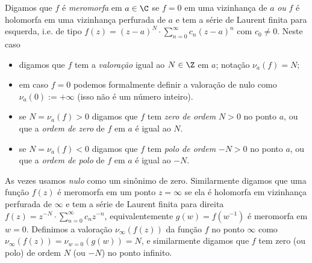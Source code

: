 \begin{defin}
Digamos que $f$ é \emph{meromorfa} em $a\in\C$ se $f=0$ em uma vizinhança de $a$
\emph{ou} $f$ é holomorfa em uma vizinhança perfurada de $a$ e tem a série de Laurent
finita para esquerda, i.e. de tipo
$f(z) = (z-a)^N \cdot \sum_{n=0}^\infty c_n (z-a)^n$
com $c_0\neq 0$.
Neste caso
\begin{itemize}
\item digamos que $f$ tem a \emph{valoração} igual ao $N\in\Z$ em $a$;
notação $\nu_a(f) = N$;
\item em caso $f=0$ podemos formalmente definir
a valoração de nulo como $\nu_a(0) := +\infty$ (isso não é um número inteiro).
\item se $N = \nu_a(f) > 0$ digamos que $f$ tem \emph{zero de ordem} $N>0$ no ponto $a$,
ou que a \emph{ordem de zero} de $f$ em $a$ é igual ao $N$.
\item se $N = \nu_a(f) < 0$ digamos que $f$ tem \emph{polo de ordem} $-N>0$ no ponto $a$,
ou que a \emph{ordem de polo} de $f$ em $a$ é igual ao $-N$.
\end{itemize}
As vezes usamos \emph{nulo} como um sinônimo de zero.
Similarmente digamos que uma função $f(z)$ é meromorfa em um ponto $z=\infty$ se ela é holomorfa
em vizinhança perfurada de $\infty$ e tem a série de Laurent finita para direita
$f(z) = z^{-N} \cdot \sum_{n=0}^\infty c_n z^{-n}$,
equivalentemente $g(w) = f(w^{-1})$ é meromorfa em $w=0$.
Definimos a valoração $\nu_\infty(f(z))$ da função $f$ no ponto $\infty$ 
como $\nu_\infty(f(z)) = \nu_{w=0}(g(w)) = N$, e similarmente digamos
que $f$ tem zero (ou polo) de ordem $N$ (ou $-N$) no ponto infinito.
\end{defin}

